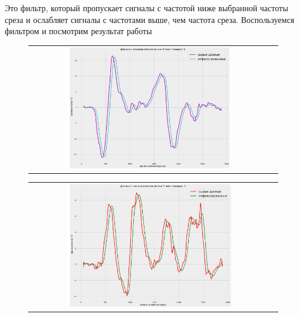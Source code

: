 Это фильтр, который пропускает сигналы с 
частотой ниже выбранной частоты среза и 
ослабляет сигналы с частотами выше, чем частота
среза. 
Воспользуемся фильтром и посмотрим результат работы
\begin{figure}[H]
    \begin{center}
        \begin{tabular}{cc}
            \includegraphics[width=0.7\textwidth]{farim/squares} & 
        \end{tabular}
    \end{center}
\end{figure}
\begin{figure}[H]
    \begin{center}
        \begin{tabular}{cc}
            \includegraphics[width=0.7\textwidth]{farim/sqxres} & 
        \end{tabular}
    \end{center}
\end{figure}

